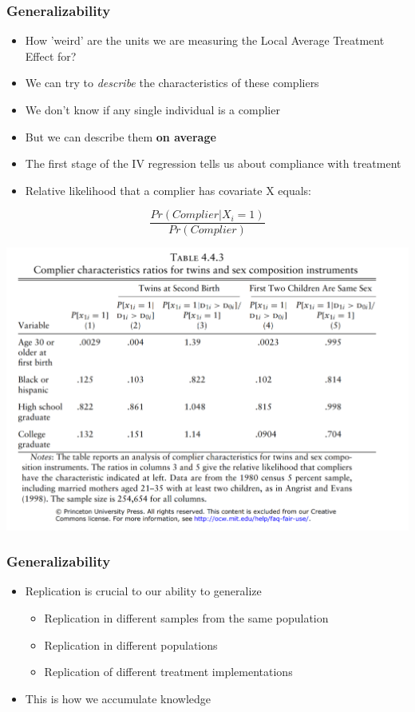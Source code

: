 \documentclass[xcolor=x11names,compress]{beamer}\usepackage[]{graphicx}\usepackage[]{color}
\renewcommand{\(}{\begin{columns}}
\renewcommand{\)}{\end{columns}}
\newcommand{\<}[1]{\begin{column}{#1}}
\renewcommand{\>}{\end{column}}
\begin{document}
\begin{frame}
\frametitle{Generalizability}
\begin{itemize}
\item How 'weird' are the units we are measuring the Local Average Treatment Effect for?
\pause
\item We can try to \textit{describe} the characteristics of these compliers
\pause
\item We don't know if any single individual is a complier
\pause
\item But we can describe them \textbf{on average}
\pause
\item The first stage of the IV regression tells us about compliance with treatment
\pause
\item Relative likelihood that a complier has covariate X equals:
\end{itemize}
\pause
$$\frac{Pr(Complier | X_i=1)}{Pr(Complier)}$$
\end{frame}

\begin{frame}
\includegraphics[width=\linewidth]{twins_compliers.png}
\end{frame}

\begin{frame}
\frametitle{Generalizability}
\begin{itemize}
\item Replication is crucial to our ability to generalize
\pause
\begin{itemize}
\item Replication in different samples from the same population
\pause
\item Replication in different populations
\pause
\item Replication of different treatment implementations
\end{itemize}
\pause
\item This is how we accumulate knowledge
\end{itemize}
\end{frame}
\end{document}
